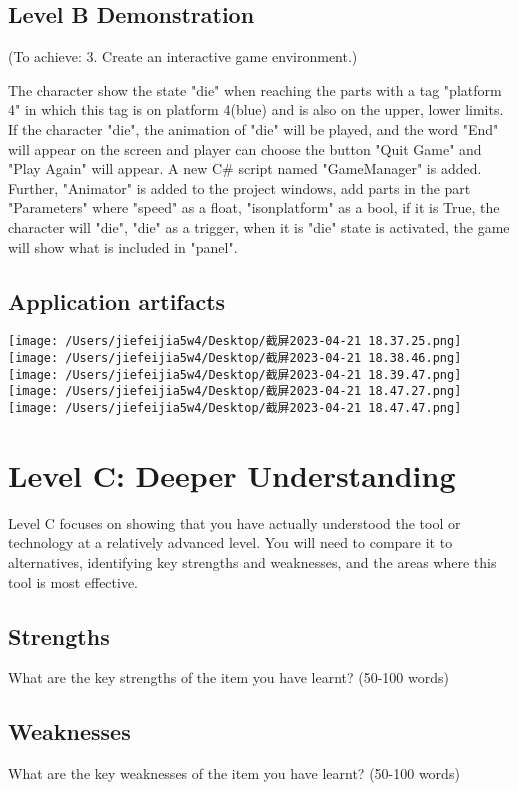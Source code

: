 \documentclass[a4paper, 11pt]{report}
\begin{document}
\subsection{Level B Demonstration}
(To achieve: 3. Create an interactive game environment.)

The character show the state "die" when reaching the parts with a tag "platform 4" in which this tag is on platform 4(blue) and is also on the upper, lower limits.  If the character "die", the animation of "die" will be played,  and the word "End" will appear on the screen and player can choose the button "Quit Game" and "Play Again" will appear. 
A new C\# script named "GameManager" is added.  Further,  "Animator" is added to the project windows,  add parts in the part "Parameters" where "speed" as a float, "isonplatform" as a bool,  if it is True, the character will "die", "die" as a trigger, when it is "die" state is activated, the game will show what is included in "panel".
\subsection{Application artifacts}
\newpage
\texttt{[image: /Users/jiefeijia5w4/Desktop/截屏2023-04-21 18.37.25.png]}
\texttt{[image: /Users/jiefeijia5w4/Desktop/截屏2023-04-21 18.38.46.png]}
\texttt{[image: /Users/jiefeijia5w4/Desktop/截屏2023-04-21 18.39.47.png]}
\texttt{[image: /Users/jiefeijia5w4/Desktop/截屏2023-04-21 18.47.27.png]}
\texttt{[image: /Users/jiefeijia5w4/Desktop/截屏2023-04-21 18.47.47.png]}



\newpage
\section{Level C: Deeper Understanding}

Level C focuses on showing that you have actually understood the tool or technology at a relatively advanced level. You will need to compare it to alternatives, identifying key strengths and weaknesses, and the areas where this tool is most effective. 

\subsection{Strengths}
What are the key strengths of the item you have learnt? (50-100 words)

\subsection{Weaknesses}
What are the key weaknesses of the item you have learnt? (50-100 words)
\end{document}
